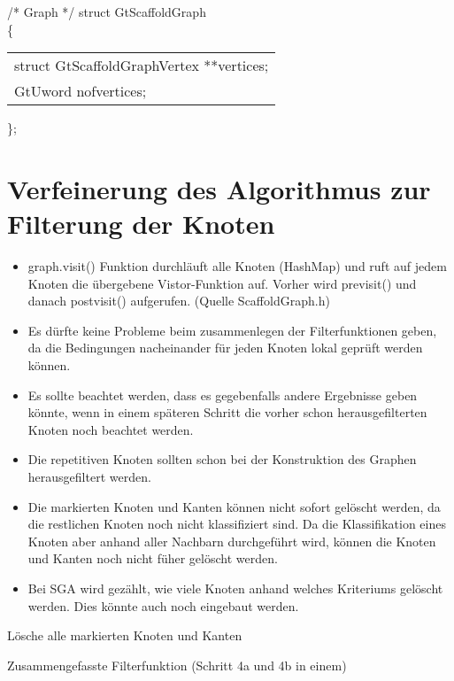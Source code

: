 \documentclass[a4paper,10pt,parskip]{scrartcl}
\begin{document}
/* Graph */
struct GtScaffoldGraph\\
\{\\
\begin{tabular}{l}
  struct GtScaffoldGraphVertex **vertices;\\
  GtUword nofvertices;
\end{tabular}
\};

\section{Verfeinerung des Algorithmus zur Filterung der Knoten}

\begin{itemize}
\item graph.visit() Funktion durchläuft alle Knoten (HashMap) und ruft
  auf jedem Knoten die übergebene Vistor-Funktion auf. Vorher wird
  previsit() und danach postvisit() aufgerufen. (Quelle
  ScaffoldGraph.h)
\item Es dürfte keine Probleme beim zusammenlegen der Filterfunktionen
  geben, da die Bedingungen nacheinander für jeden Knoten lokal
  geprüft werden können.
\item Es sollte beachtet werden, dass es gegebenfalls andere
  Ergebnisse geben könnte, wenn in einem späteren Schritt die vorher
  schon herausgefilterten Knoten noch beachtet werden.
\item Die repetitiven Knoten sollten schon bei der Konstruktion des
  Graphen herausgefiltert werden.
\item Die markierten Knoten und Kanten können nicht sofort gelöscht
  werden, da die restlichen Knoten noch nicht klassifiziert sind. Da
  die Klassifikation eines Knoten aber anhand aller Nachbarn
  durchgeführt wird, können die Knoten und Kanten noch nicht füher
  gelöscht werden.
\item Bei SGA wird gezählt, wie viele Knoten anhand welches Kriteriums
  gelöscht werden. Dies könnte auch noch eingebaut werden.
\end{itemize}

\begin{algorithm}[H]
  Lösche alle markierten Knoten und Kanten\;
  \caption{Zusammengefasste Filterfunktion (Schritt 4a und 4b in einem)}
\end{algorithm}
\end{document}
